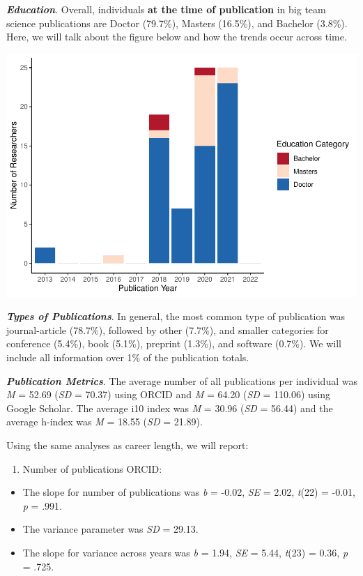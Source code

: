 \documentclass[
  man]{apa6}
\providecommand{\tightlist}{%
  \setlength{\itemsep}{0pt}\setlength{\parskip}{0pt}}
\begin{document}
\textbf{\emph{Education}}. Overall, individuals \textbf{at the time of publication} in big team science publications are Doctor (79.7\%), Masters (16.5\%), and Bachelor (3.8\%). Here, we will talk about the figure below and how the trends occur across time.

\includegraphics{04.manuscript_files/figure-latex/figure4-1.pdf}

\textbf{\emph{Types of Publications}}. In general, the most common type of publication was journal-article (78.7\%), followed by other (7.7\%), and smaller categories for conference (5.4\%), book (5.1\%), preprint (1.3\%), and software (0.7\%). We will include all information over 1\% of the publication totals.

\textbf{\emph{Publication Metrics}}. The average number of all publications per individual was \emph{M} = 52.69 (\emph{SD} = 70.37) using ORCID and \emph{M} = 64.20 (\emph{SD} = 110.06) using Google Scholar. The average i10 index was \emph{M} = 30.96 (\emph{SD} = 56.44) and the average h-index was \emph{M} = 18.55 (\emph{SD} = 21.89).

Using the same analyses as career length, we will report:

\begin{enumerate}
\def\labelenumi{\arabic{enumi})}
\tightlist
\item
  Number of publications ORCID:
\end{enumerate}

\begin{itemize}
\tightlist
\item
  The slope for number of publications was \emph{b} = -0.02, \emph{SE} = 2.02, \emph{t}(22) = -0.01, \emph{p} = .991.
\item
  The variance parameter was \emph{SD} = 29.13.
\item
  The slope for variance across years was \emph{b} = 1.94, \emph{SE} = 5.44, \emph{t}(23) = 0.36, \emph{p} = .725.
\end{itemize}
\end{document}
